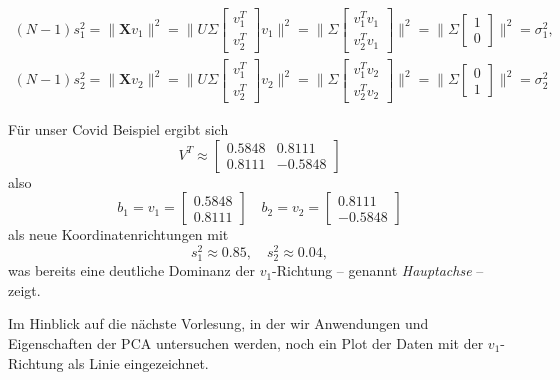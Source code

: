 \documentclass[]{book}
\theoremstyle{definition}
\theoremstyle{definition}
\theoremstyle{definition}
\theoremstyle{definition}
\theoremstyle{remark}
\begin{document}
\begin{align*}
(N-1)s_1^2 
= \|\mathbf X v_1 \|^2 = \|U \Sigma \begin{bmatrix} v_1^T \\ v_2^T \end{bmatrix}v_1\|^2
= \|\Sigma \begin{bmatrix} v_1^Tv_1 \\ v_2^T v_1\end{bmatrix}\|^2
=  \|\Sigma \begin{bmatrix} 1 \\  0\end{bmatrix}\|^2
=\sigma_1^2,\\
(N-1)s_2^2 
= \|\mathbf X v_2 \|^2 = \|U \Sigma \begin{bmatrix} v_1^T \\ v_2^T \end{bmatrix}v_2\|^2
= \|\Sigma \begin{bmatrix} v_1^Tv_2 \\ v_2^T v_2\end{bmatrix}\|^2
=  \|\Sigma \begin{bmatrix} 0 \\  1\end{bmatrix}\|^2
=\sigma_2^2
\end{align*}

Für unser Covid Beispiel ergibt sich
\begin{equation*}
V^T \approx
\begin{bmatrix}
0.5848 &  0.8111 \\
0.8111 & -0.5848
\end{bmatrix}
\end{equation*}
also
\begin{equation*}
b_1 = v_1 = \begin{bmatrix}
0.5848 \\  0.8111 
\end{bmatrix}
\quad
b_2 = v_2 = \begin{bmatrix}
0.8111 \\ -0.5848
\end{bmatrix}
\end{equation*}
als neue Koordinatenrichtungen mit
\begin{equation*}
s_1^2 \approx 0.85, \quad s_2^2 \approx 0.04,
\end{equation*}
was bereits eine deutliche Dominanz der \(v_1\)-Richtung -- genannt \emph{Hauptachse} -- zeigt.

Im Hinblick auf die nächste Vorlesung, in der wir Anwendungen und Eigenschaften der PCA untersuchen werden, noch ein Plot der Daten mit der \(v_1\)-Richtung als Linie eingezeichnet.
\end{document}

